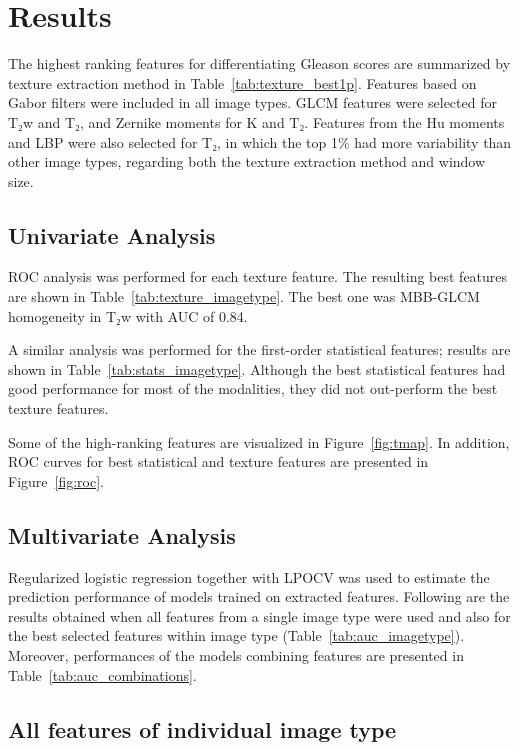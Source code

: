\section{Results}

The highest ranking features for differentiating Gleason scores are summarized
by texture extraction method in Table~\ref{tab:texture_best1p}. Features based
on Gabor filters were included in all image types. GLCM features were selected
for T₂w and T₂, and Zernike moments for K and T₂. Features from the Hu
moments and LBP were also selected for T₂, in which the top 1\% had more
variability than other image types, regarding both the texture extraction method
and window size.


\subsection{Univariate Analysis}

ROC analysis was performed for each texture feature. The resulting best features
are shown in Table~\ref{tab:texture_imagetype}. The best one was MBB-GLCM
homogeneity in T₂w with AUC of 0.84.

A similar analysis was performed for the first-order statistical features;
results are shown in Table~\ref{tab:stats_imagetype}. Although the best
statistical features had good performance for most of the modalities, they did
not out-perform the best texture features.

Some of the high-ranking features are visualized in Figure~\ref{fig:tmap}. In
addition, ROC curves for best statistical and texture features are presented in
Figure~\ref{fig:roc}.


\subsection{Multivariate Analysis}

Regularized logistic regression together with LPOCV was used to estimate the
prediction performance of models trained on extracted features. Following are
the results obtained when all features from a single image type were used and
also for the best selected features within image type
(Table~\ref{tab:auc_imagetype}). Moreover, performances of the models combining
features are presented in Table~\ref{tab:auc_combinations}.


\subsection{All features of individual image type}

